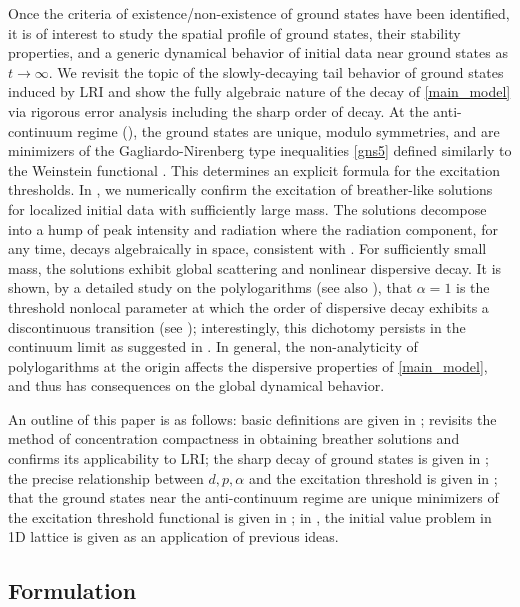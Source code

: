 \documentclass{article}
\numberwithin{equation}{section}
\begin{document}
Once the criteria of existence/non-existence of ground states have been identified, it is of interest to study the spatial profile of ground states, their stability properties, and a generic dynamical behavior of initial data near ground states as $t \rightarrow \infty$. We revisit the topic of the slowly-decaying tail behavior of ground states \cite{gaididei1997effects,flach1998breathers,moleron2019nonlinear} induced by LRI and show the fully algebraic nature of the decay of \eqref{main_model} via rigorous error analysis including the sharp order of decay. At the anti-continuum regime (), the ground states are unique, modulo symmetries, and are minimizers of the Gagliardo-Nirenberg type inequalities \eqref{gns5} defined similarly to the Weinstein functional \cite{cmp/1103922134}. This determines an explicit formula for the excitation thresholds. In , we numerically confirm the excitation of breather-like solutions for localized initial data with sufficiently large mass. The solutions decompose into a hump of peak intensity and radiation where the radiation component, for any time, decays algebraically in space, consistent with . For sufficiently small mass, the solutions exhibit global scattering and nonlinear dispersive decay. It is shown, by a detailed study on the polylogarithms (see also \cite[Appendix]{gori2013modulational}), that $\alpha = 1$ is the threshold nonlocal parameter at which the order of dispersive decay exhibits a discontinuous transition (see ); interestingly, this dichotomy persists in the continuum limit as suggested in \cite[Remark 2]{hong2019strong}. In general, the non-analyticity of polylogarithms at the origin affects the dispersive properties of \eqref{main_model}, and thus has consequences on the global dynamical behavior.

An outline of this paper is as follows: basic definitions are given in ;  revisits the method of concentration compactness in obtaining breather solutions and confirms its applicability to LRI; the sharp decay of ground states is given in ; the precise relationship between $d,p,\alpha$ and the excitation threshold is given in ; that the ground states near the anti-continuum regime are unique minimizers of the excitation threshold functional is given in ; in , the initial value problem in 1D lattice is given as an application of previous ideas.
\subsection{Formulation}\label{formulation}
\end{document}
